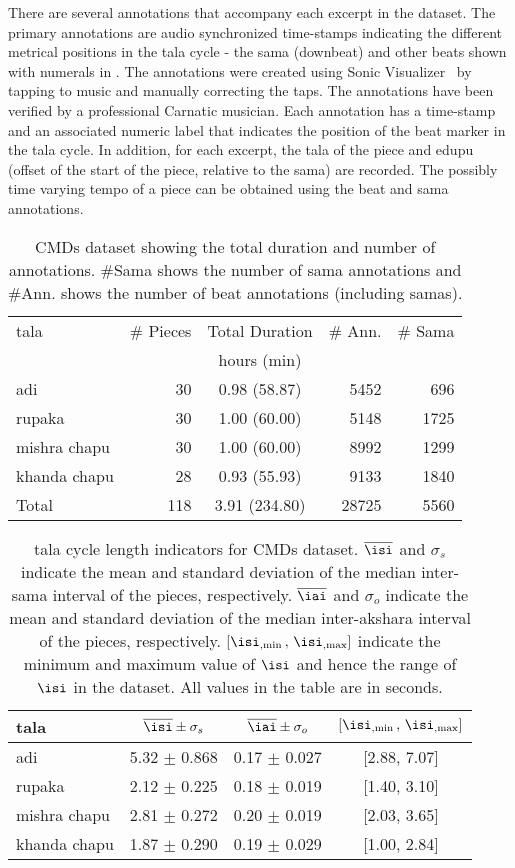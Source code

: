 There are several annotations that accompany each excerpt in the dataset. The primary annotations are audio synchronized time-stamps indicating the different metrical positions in the \gls{tala} cycle - the \gls{sama} (downbeat) and other beats shown with numerals in . The annotations were created using Sonic Visualizer~\cite{cannam:10:sv} by tapping to music and manually correcting the taps. The annotations have been verified by a professional Carnatic musician. Each annotation has a time-stamp and an associated numeric label that indicates the position of the beat marker in the \gls{tala} cycle. In addition, for each excerpt, the \gls{tala} of the piece and \gls{edupu} (offset of the start of the piece, relative to the sama) are recorded. The possibly time varying tempo of a piece can be obtained using the beat and \gls{sama} annotations. 
\begin{table}[t]
\centering
\begin{tabular}{@{}lrcrr@{}}
\toprule 
\Gls{tala} & \# Pieces & Total Duration & \# Ann. & \# Sama\tabularnewline
 &  & hours (min) &  & \tabularnewline
\midrule 
\Gls{adi} & 30 & 0.98 (58.87) & 5452 & 696\tabularnewline
\Gls{rupaka} & 30 & 1.00 (60.00) & 5148 & 1725\tabularnewline
\Gls{mishra chapu} & 30 & 1.00 (60.00) & 8992 & 1299\tabularnewline
\Gls{khanda chapu} & 28 & 0.93 (55.93) & 9133 & 1840\tabularnewline
\midrule 
Total & 118 & 3.91 (234.80) & 28725 & 5560\tabularnewline
\bottomrule 
\end{tabular}
\protect\caption[\acrshort{CMDs} dataset description]{\acrshort{CMDs} dataset showing the total duration and number of annotations. \#Sama shows the number of \gls{sama} annotations and \#Ann. shows the number of beat annotations (including \glspl{sama}).}
\label{tab:dataset:cmd}
\end{table}
%
\begin{table}[t]
\centering
\begin{tabular}{@{}lccc@{}}
\toprule 
\Gls{tala} & $\overline{\isi} \pm \sigma_s$ & $\overline{\iai} \pm \sigma_o$ & $[{\isi}_{,\min} \, , \,  {\isi}_{,\max} ]$ \tabularnewline
\midrule 
\Gls{adi} & 5.32 $\pm$ 0.868 & 0.17 $\pm$ 0.027 & {[}2.88, 7.07{]}\tabularnewline
\Gls{rupaka} & 2.12 $\pm$ 0.225 & 0.18 $\pm$ 0.019 & {[}1.40, 3.10{]}\tabularnewline
\Gls{mishra chapu} & 2.81 $\pm$ 0.272  & 0.20 $\pm$ 0.019  & {[}2.03, 3.65{]}\tabularnewline
\Gls{khanda chapu} & 1.87 $\pm$ 0.290 & 0.19 $\pm$ 0.029 & {[}1.00, 2.84{]}\tabularnewline
\bottomrule 
\end{tabular}
\protect\caption[\Gls{tala} cycle length indicators for \acrshort{CMDs} dataset]{\Gls{tala} cycle length indicators for \acrshort{CMDs} dataset. $\overline{\isi}$ and $\sigma_s$ indicate the mean and standard deviation of the median inter-\gls{sama} interval of the pieces, respectively. $\overline{\iai}$ and $\sigma_o$ indicate the mean and standard deviation of the median inter-\gls{akshara} interval of the pieces, respectively. $[{\isi}_{,\min} \, , \,  {\isi}_{,\max}]$ indicate the minimum and maximum value of $\isi$ and hence the range of $\isi$ in the dataset. All values in the table are in seconds.}
\label{tab:datastat:cmd}
\end{table}

